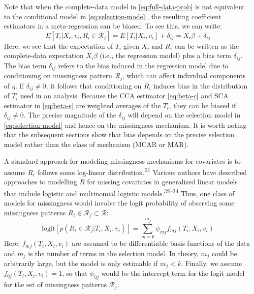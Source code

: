 \documentclass[
]{article}
\begin{document}
Note that when the complete-data model in \eqref{eq:full-data-prob} is not equivalent to the conditional model in \eqref{eq:selection-model}, the resulting coefficient estimators in a meta-regression can be biased.
To see this, we can write:
\begin{equation}
E[T_i | X_i, v_i, R_i \in \mathcal{R}_j] 
  = E[T_i | X_i, v_i] + \delta_{ij} 
  = X_i \beta + \delta_{ij}
\label{eq:bias-delta}
\end{equation}
Here, we see that the expectation of \(T_i\) given \(X_i\) and \(R_i\) can be written as the complete-data expectation \(X_i \beta\) (i.e., the regression model) plus a bias term \(\delta_{ij}\).
The bias term \(\delta_{ij}\) refers to the bias induced in the regression model due to conditioning on missingness pattern \(\mathcal{R}_j\), which can affect individual components of \(\eta\).
If \(\delta_{ij} \neq 0\), it follows that conditioning on \(R_i\) induces bias in the distribution of \(T_i\) used in an analysis.
Because the CCA estimator \eqref{eq:beta-c} and SCA estimator in \eqref{eq:beta-s} are weighted averages of the \(T_i\), they can be biased if \(\delta_{ij} \neq 0\).
The precise magnitude of the \(\delta_{ij}\) will depend on the selection model in \eqref{eq:selection-model} and hence on the missingness mechanism.
It is worth noting that the subsequent sections show that bias depends on the precise selection model rather than the class of mechanism (MCAR or MAR).

A standard approach for modeling missingness mechanisms for covariates is to assume \(R_i\) follows some log-linear distribution.\textsuperscript{31}
Various authors have described approaches to modelling \(R\) for missing covariates in generalized linear models that include logistic and multinomial logistic models.\textsuperscript{32--34}
Thus, one class of models for missingness would involve the logit probability of observing some missingness patterns \(R_i \in \mathcal{R}_j \subset \mathcal{R}\):
\begin{equation}
\text{logit}[p(R_i \in \mathcal{R}_j | T_i, X_i, v_i)] = \sum_{m = 0}^{m_j} \psi_{mj} f_{mj}(T_i, X_i, v_i) 
\label{eq:r-loglinear}
\end{equation}
Here, \(f_{mj}(T_i, X_i, v_i)\) are assumed to be differentiable basis functions of the data and \(m_j\) is the number of terms in the selection model.
In theory, \(m_j\) could be arbitrarily large, but the model is only estimable if \(m_j < k\).
Finally, we assume \(f_{0j}(T_i, X_i, v_i) = 1\), so that \(\psi_{0j}\) would be the intercept term for the logit model for the set of missingness patterns \(\mathcal{R}_j\).
\end{document}
